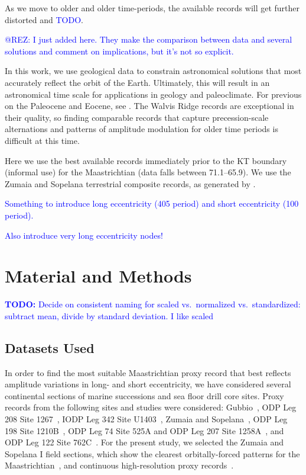 \documentclass[draft]{agujournal2019}
\newcommand{\ijk}{\textcolor{blue}}
\begin{document}
As we move to older and older time-periods, the available records will get further distorted and \ijk{TODO}.

\ijk{@REZ: I just added \cite{Westerhold2017} here. They make the comparison between data and several solutions and comment on implications, but it's not so explicit.}

In this work, we use geological data to constrain astronomical solutions that most accurately reflect the orbit of the Earth.
Ultimately, this will result in an astronomical time scale for applications in geology and paleoclimate.
For previous on the Paleocene and Eocene, see .
The Walvis Ridge records are exceptional in their quality, so finding comparable records that capture precession-scale alternations and patterns of amplitude modulation for older time periods is difficult at this time.

Here we use the best available records immediately prior to the \gls{KT} boundary (informal use)
for the Maastrichtian (data falls between \qtyrange{71.1}{65.9}{\millionyearago}).
We use the Zumaia and Sopelana terrestrial composite records, as generated by .

\ijk{Something to introduce long eccentricity (\qty{405}{\kiloyear} period) and short eccentricity (\qty{100}{\kiloyear} period).}

\ijk{Also introduce very long eccentricity nodes!}


\section{Material and Methods}\label{sec:mm}

\ijk{\textbf{TODO:} Decide on consistent naming for
scaled vs.\
normalized vs.\
standardized:
subtract mean, divide by standard deviation.
I like scaled}

\subsection{Datasets Used}\label{sec:data}

In order to find the most suitable Maastrichtian proxy record that best reflects amplitude variations in long- and short eccentricity,
we have considered several continental sections of marine successions and sea floor drill core sites.
Proxy records from the following sites and studies were considered:
Gubbio~\cite{Voigt2012,Sinnesael2016},
ODP Leg 208 Site 1267~\cite{Westerhold2007,Westerhold2008,Husson2011},
IODP Leg 342 Site U1403~\cite{Batenburg2018},
Zumaia and Sopelana~\cite{tenKateSprenger1993,Batenburg2012,Batenburg2014,Dinares-Turell2013},
ODP Leg 198 Site 1210B~\cite{Jung2012,Kim2022},
ODP Leg 74 Site 525A and ODP Leg 207 Site 1258A~\citeA{Husson2011},
and ODP Leg 122 Site 762C~.
For the present study, we selected the Zumaia and Sopelana I field sections,
which show the clearest orbitally-forced patterns for the Maastrichtian~\cite{tenKateSprenger1993,Batenburg2012,Dinares-Turell2013},
and continuous high-resolution proxy records~\cite{Batenburg2012,Batenburg2014}.
\end{document}
